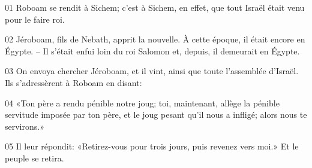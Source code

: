 01 Roboam se rendit à Sichem; c’est à Sichem, en effet, que tout Israël était venu pour le faire roi.

02 Jéroboam, fils de Nebath, apprit la nouvelle. À cette époque, il était encore en Égypte. – Il s’était enfui loin du roi Salomon et, depuis, il demeurait en Égypte.

03 On envoya chercher Jéroboam, et il vint, ainsi que toute l’assemblée d’Israël. Ils s’adressèrent à Roboam en disant:

04 «Ton père a rendu pénible notre joug; toi, maintenant, allège la pénible servitude imposée par ton père, et le joug pesant qu’il nous a infligé; alors nous te servirons.»

05 Il leur répondit: «Retirez-vous pour trois jours, puis revenez vers moi.» Et le peuple se retira.
